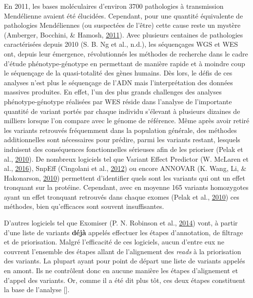 \documentclass[12pt,twoside]{reedthesis}
\theoremstyle{definition}
\theoremstyle{definition}
\theoremstyle{remark}
\begin{document}
  En 2011, les bases moléculaires d'environ 3700 pathologies à
  transmission Mendélienne avaient été élucidées. Cependant, pour une
  quantité équivalente de pathologies Mendéliennes (ou suspectées de
  l'être) cette cause reste un mystère (Amberger, Bocchini, \& Hamosh,
  \protect\hyperlink{ref-Amberger2011}{2011}). Avec plusieurs centaines de
  pathologies caractérisées depuis 2010 (S. B. Ng et al., n.d.), les
  séquençages WGS et WES ont, depuis leur émergence, révolutionnés les
  méthodes de recherche dans le cadre d'étude phénotype-génotype en
  permettant de manière rapide et à moindre coup le séquençage de la
  quasi-totalité des gènes humains. Dès lors, le défis de ces analyses
  n'est plus le séquençage de l'ADN mais l'interprétation des données
  massives produites. En effet, l'un des plus grands challenges des
  analyses phénotype-génotype réalisées par WES réside dans l'analyse de
  l'importante quantité de variant portés par chaque individu s'élevant à
  plusieurs dizaines de milliers lorsque l'on compare avec le génome de
  référence. Même après avoir retiré les variants retrouvés fréquemment
  dans la population générale, des méthodes additionnelles sont
  nécessaires pour prédire, parmi les variants restant, lesquels induisent
  des conséquences fonctionnelles sérieuses afin de les prioriser (Pelak
  et al., \protect\hyperlink{ref-Pelak2010}{2010}). De nombreux logiciels
  tel que Variant Effect Predictor (W. McLaren et al.,
  \protect\hyperlink{ref-McLaren2016}{2016}), SnpEff (Cingolani et al.,
  \protect\hyperlink{ref-Cingolani2012}{2012}) ou encore ANNOVAR (K. Wang,
  Li, \& Hakonarson, \protect\hyperlink{ref-Wang2010}{2010}) permettent
  d'identifier quels sont les variants qui ont un effet tronquant sur la
  protéine. Cependant, avec en moyenne 165 variants homozygotes ayant un
  effet tronquant retrouvés dans chaque exomes (Pelak et al.,
  \protect\hyperlink{ref-Pelak2010}{2010}) ces méthodes, bien qu'efficaces
  sont souvent insuffisantes.
  
  D'autres logiciels tel que Exomiser (P. N. Robinson et al.,
  \protect\hyperlink{ref-Robinson2014}{2014}) vont, à partir d'une liste
  de variants \textbf{déjà} appelés effectuer les étapes d'annotation, de
  filtrage et de priorisation. Malgré l'efficacité de ces logiciels, aucun
  d'entre eux ne couvrent l'ensemble des étapes allant de l'alignement des
  \emph{reads} à la priorisation des variants. La plupart ayant pour point
  de départ une liste de variants appelés en amont. Ils ne contrôlent donc
  en aucune manière les étapes d'alignement et d'appel des variants. Or,
  comme il a été dit plus tôt, ces deux étapes constituent la base de
  l'analyse {[}{]}.
  
\end{document}
